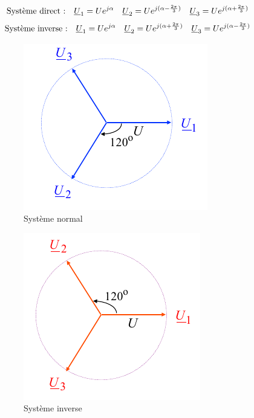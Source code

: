 \documentclass[12pt,a4paper]{article}
\newcommand{\uu}{\uline{U} }
\begin{document}
\textcolor{blue}{\begin{equation}
	\text{Système direct :} \quad \uu_1 = Ue^{j\alpha} \quad \uu_2 = Ue^{j(\alpha - \frac{2\pi}{3})} \quad \uu_3 = Ue^{j(\alpha + \frac{2\pi}{3})}
\end{equation}}
\textcolor{red}{\begin{equation}
	\text{Système inverse :} \quad \uu_1 = Ue^{j\alpha} \quad \uu_2 = Ue^{j(\alpha + \frac{2\pi}{3})} \quad \uu_3 = Ue^{j(\alpha - \frac{2\pi}{3})}
\end{equation}}
\begin{figure}
	\centering
	\begin{subfigure}[b]{0.3\textwidth}
		\centering
		\includegraphics[scale=0.6]{images/phaseur_triphase_normal}
		\caption{Système normal}
		\label{fig: phaseurs triphase normal}
	\end{subfigure}
	\begin{subfigure}[b]{0.3\textwidth}
		\centering
		\includegraphics[scale=0.6]{images/phaseur_triphase_inverse}
		\caption{Système inverse}
		\label{fig: phaseurs triphase inverse}
	\end{subfigure}
	\begin{subfigure}[b]{0.3\textwidth}

\end{subfigure}
\end{figure}
\end{document}
